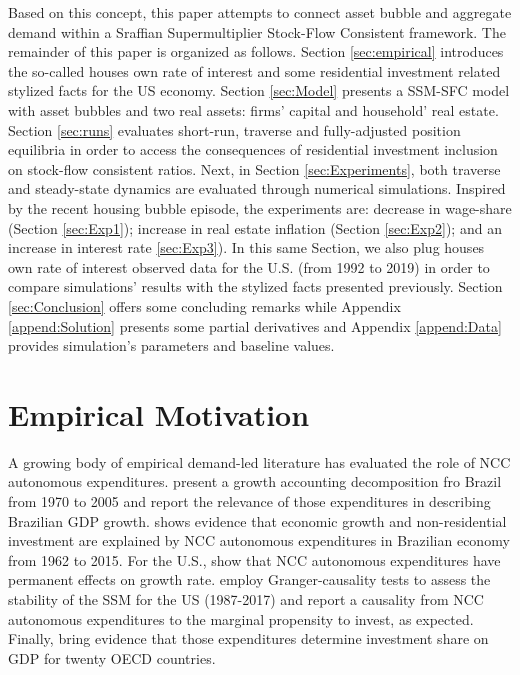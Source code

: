 \documentclass[11pt]{article}
\begin{document}
Based on this concept, this paper attempts to connect asset bubble and aggregate demand within a Sraffian Supermultiplier Stock-Flow Consistent framework. 
The remainder of this paper is organized as follows.
Section \ref{sec:empirical} introduces the so-called houses own rate of interest and some residential investment related stylized facts for the US economy.
Section \ref{sec:Model} presents a SSM-SFC model  with asset bubbles and two real assets: firms' capital and household' real estate. 
Section \ref{sec:runs} evaluates short-run, traverse and fully-adjusted position equilibria in order to access the consequences of residential investment inclusion on stock-flow consistent ratios.
Next, in Section \ref{sec:Experiments}, both traverse and steady-state dynamics are evaluated through numerical simulations.
Inspired by the recent housing bubble episode, the experiments are: decrease in wage-share (Section \ref{sec:Exp1}); increase in real estate inflation (Section \ref{sec:Exp2}); and an increase in interest rate \ref{sec:Exp3}).
In this same Section, we also plug houses own rate of interest observed data for the U.S. (from 1992 to 2019) in order to compare simulations' results with the stylized facts presented previously.
Section \ref{sec:Conclusion} offers some concluding remarks while Appendix \ref{append:Solution} presents some partial derivatives and Appendix \ref{append:Data} provides simulation's parameters and baseline values.



\section{Empirical Motivation}
\label{sec:orga11096b}
\label{sec:empirical}
A growing body of empirical demand-led literature has evaluated the role of NCC autonomous expenditures.
\textcite{freitas_pattern_2013} present a growth accounting decomposition fro Brazil from 1970 to 2005 and report the relevance of those expenditures in describing Brazilian GDP growth. \textcite{braga_investment_2018} shows evidence that economic growth and non-residential investment are explained by NCC autonomous expenditures in Brazilian economy from 1962 to 2015. For the U.S., \textcite{girardi_long-run_2016} show that NCC autonomous expenditures have permanent effects on growth rate. 
\textcite{haluska_growth_2019} employ Granger-causality tests to assess the stability of the SSM for the US (1987-2017) and report a causality from NCC autonomous expenditures to the marginal propensity to invest, as expected.
Finally, \textcite{girardi_autonomous_2018} bring evidence that those expenditures determine investment share on GDP for twenty OECD countries.
\end{document}

